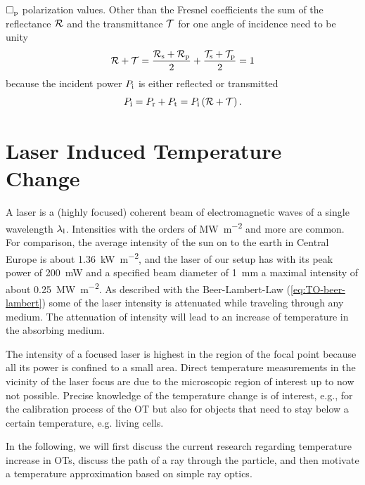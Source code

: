 $\Box_{\mathrm{p}}$ polarization values. Other than the Fresnel coefficients the 
sum of the reflectance $\mathcal{R}$ and the transmittance $\mathcal{T}$ for one 
angle of incidence need to be unity
\begin{equation}
  \mathcal{R} + \mathcal{T} = 
  \frac{\mathcal{R}_{\mathrm{s}}+\mathcal{R}_{\mathrm{p}}}{2} +
  \frac{\mathcal{T}_{\mathrm{s}}+\mathcal{T}_{\mathrm{p}}}{2} = 1 
  \label{eq:TO-fresnel}
\end{equation}
because the incident power $P_{\mathrm{i}}$ is either reflected or transmitted
\begin{equation}
  P_{\mathrm{i}} = P_{\mathrm{r}} + P_{\mathrm{t}} = P_{\mathrm{i}}\left( \mathcal{R} + \mathcal{T} 
  \right).
\end{equation}

\section{Laser Induced Temperature Change\label{sec:TO-temperature}}

A laser is a (highly focused) coherent beam of electromagnetic waves of a 
single wavelength $\lambda_{\mathrm{l}}$. Intensities with the orders of 
\si{\mega\watt\per\square\meter} and more are common. For comparison, the 
average intensity of the sun on to the earth in Central Europe is about 
\SI{1.36}{\kilo\watt\per\square\meter}, and the laser of our setup has with its 
peak power of \SI{200}{\milli\watt} and a specified beam diameter of 
\SI{1}{\mm} a maximal intensity of about 
\SI{0.25}{\mega\watt\per\square\meter}. As described with the Beer-Lambert-Law
(\cref{eq:TO-beer-lambert}) some of the laser intensity is attenuated while 
traveling through any medium. The attenuation of intensity will lead to an 
increase of temperature in the absorbing medium.

The intensity of a focused laser is highest in the region of the focal point 
because all its power is confined to a small area. Direct temperature 
measurements in the vicinity of the laser focus are due to the microscopic 
region of interest up to now not possible. Precise knowledge of the temperature 
change is of interest, e.g., for the calibration process of the OT but also for 
objects that need to stay below a certain temperature, e.g. living cells.

In the following, we will first discuss the current research regarding 
temperature increase in OTs, discuss the path of a ray through the particle, 
and then motivate a temperature approximation based on simple ray optics.

